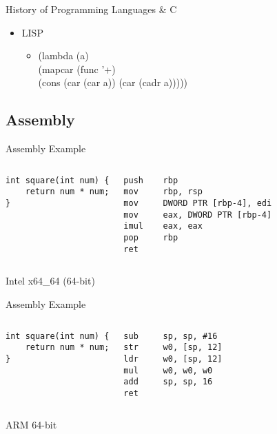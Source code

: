 \documentclass[graphics]{beamer}
\begin{document}
\begin{frame}{History of Programming Languages \& C}
{\begin{itemize}
\begin{itemize}
                \item H = SQRT((S1*S2)+(S2*S2))
            \end{itemize}
            \item LISP
            \begin{itemize}
                \item (lambda (a) \\
	            (mapcar (func '+) \\
	            (cons (car (car a)) (car (cadr a)))))
            \end{itemize}
        \end{itemize}
    }
\end{frame}

\subsection{Assembly}
\begin{frame}[fragile]{Assembly Example}
    \begin{columns}
            \begin{verbatim}
int square(int num) {
    return num * num;
}
            \end{verbatim}
            \footnotesize
            \begin{verbatim}
push    rbp
mov     rbp, rsp
mov     DWORD PTR [rbp-4], edi
mov     eax, DWORD PTR [rbp-4]
imul    eax, eax
pop     rbp
ret
    \end{verbatim}
    \end{columns}
    \vfill
    Intel x64\_64 (64-bit)
\end{frame}

\begin{frame}[fragile]{Assembly Example}
    \begin{columns}
            \begin{verbatim}
int square(int num) {
    return num * num;
}
            \end{verbatim}
            \footnotesize
            \begin{verbatim}
sub     sp, sp, #16
str     w0, [sp, 12]
ldr     w0, [sp, 12]
mul     w0, w0, w0
add     sp, sp, 16
ret
    \end{verbatim}
    \end{columns}
    \vfill
    ARM 64-bit
\end{frame}
\end{document}
